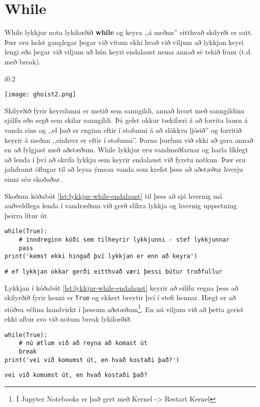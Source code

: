 \section{While}
While lykkjur nota lykilorðið \textbf{while} og keyra ,,á meðan'' eitthvað skilyrði er satt.
Þær eru helst ganglegar þegar við vitum ekki hvað við viljum að lykkjan keyri lengi eða þegar við viljum að hún keyri endalaust nema annað sé tekið fram (t.d. með break).
\begin{wrapfigure}{i}{0.2\textwidth} %
	\begin{center}
		\texttt{[image: ghoist2.png]}
	\end{center}
\end{wrapfigure}
Skilyrðið fyrir keyrslunni er metið sem sanngildi, annað hvort með sanngildinu sjálfu eða segð sem skilar sanngildi.
Þá gefst okkur tækifæri á að forrita lausn á vanda eins og ,,ef það er enginn eftir í stofunni á að slökkva ljósið'' og forritið keyrir á meðan ,,einhver er eftir í stofunni''.
Þarna þurfum við ekki að gera annað en að fylgjast með aðstæðum.
While lykkjur eru vandmeðfarnar og harla líklegt að lenda í því að skrifa lykkju sem keyrir endalaust við fyrstu notkun.
Þær eru jafnframt öflugar til að leysa ýmsan vanda sem krefst þess að aðstæður hverju sinni séu skoðaðar.

Skoðum kóðabút \ref{lst:lykkjur-while-endalaust} til þess að sjá hvernig má auðveldlega lenda í vandræðum við gerð slíkra lykkja og hvernig uppsetning þeirra lítur út.


\begin{lstlisting}[caption=while lykkja sem keyrir að eilífu, label=lst:lykkjur-while-endalaust]
while(True):
	# inndreginn kóði sem tilheyrir lykkjunni - stef lykkjunnar
	pass
print('kemst ekki hingað því lykkjan er enn að keyra')
\end{lstlisting}
\lstset{style=uttak}
\begin{lstlisting}
# ef lykkjan okkar gerði eitthvað væri þessi bútur troðfullur
\end{lstlisting}
\lstset{style=venjulegt}
Lykkjan í kóðabút \ref{lst:lykkjur-while-endalaust} keyrir að eilífu vegna þess að skilyrðið fyrir henni er \texttt{True} og ekkert breytir því í stefi hennar.
Hægt er að stöðva vélina handvirkt í þessum aðstæðum\footnote{Í Jupyter Notebooks er það gert með Kernel -> Restart Kernel}.
En nú viljum við að þetta gerist ekki aftur svo við notum break lykilorðið.


\begin{lstlisting}[caption=while lykkja sem keyrir ekki að eilífu en hún gerir ekkert, label=lst:lykkjur-while-break]
while(True):
	# nú ætlum við að reyna að komast út
	break
print('vei við komumst út, en hvað kostaði það?')
\end{lstlisting}
\lstset{style=uttak}
\begin{lstlisting}
vei við komumst út, en hvað kostaði það?
\end{lstlisting}
\lstset{style=venjulegt}

